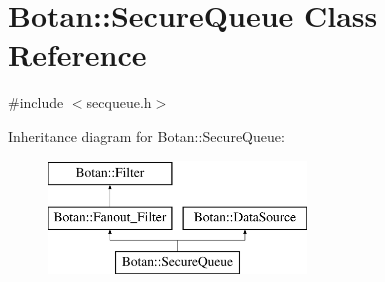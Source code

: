 \hypertarget{classBotan_1_1SecureQueue}{\section{Botan\-:\-:Secure\-Queue Class Reference}
\label{classBotan_1_1SecureQueue}
}


{\ttfamily \#include $<$secqueue.\-h$>$}

Inheritance diagram for Botan\-:\-:Secure\-Queue\-:\begin{figure}[H]
\begin{center}
\leavevmode
\includegraphics[height=3.000000cm]{classBotan_1_1SecureQueue}
\end{center}
\end{figure}
